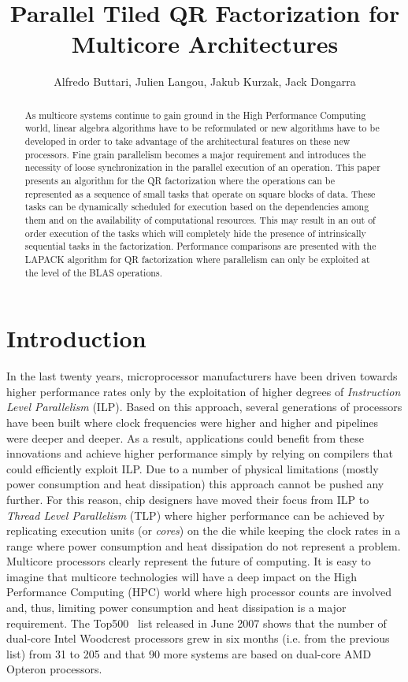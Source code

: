 \documentclass[runningheads]{llncs}
\title{Parallel Tiled QR Factorization for Multicore Architectures}
\author{Alfredo Buttari\inst{1},
  Julien Langou\inst{3},
  Jakub Kurzak\inst{1},
  Jack Dongarra\inst{1}\inst{2}
  }
\institute{Department of Electrical Engineering and Computer
Science, University Tennessee, Knoxville, Tennessee \and Computer
Science and Mathematics Division, Oak Ridge National Laboratory, Oak
Ridge, Tennessee \and Department of Mathematical Sciences,
University of Colorado at Denver and Health Sciences Center,
Colorado}
\begin{document}
\maketitle
\setcounter{page}{1}

\begin{abstract}
As multicore systems continue to gain ground in the High Performance
Computing world, linear algebra algorithms have to be reformulated
or new algorithms have to be developed in order to take advantage of
the architectural features on these new processors. Fine grain
parallelism becomes a major requirement and introduces the necessity
of loose synchronization in the parallel execution of an operation.
This paper presents an algorithm for the QR factorization where the
operations can be represented as a sequence of small tasks that
operate on square blocks of data. These tasks can be dynamically
scheduled for execution based on the dependencies among them and on
the availability of computational resources. This may result in an
out of order execution of the tasks which will completely hide the
presence of intrinsically sequential tasks in the factorization.
Performance comparisons are presented with the LAPACK algorithm for
QR factorization where parallelism can only be exploited at the
level of the BLAS operations.
\end{abstract}



\section{Introduction}

In the last twenty years, microprocessor manufacturers have been
driven towards higher performance rates only by the exploitation of
higher degrees of {\em Instruction Level Parallelism} (ILP). Based
on this approach, several generations of processors have been built
where clock frequencies were higher and higher and pipelines were
deeper and deeper. As a result, applications could benefit from
these innovations and achieve higher performance simply by relying
on compilers that could efficiently exploit ILP. Due to a number of
physical limitations (mostly power consumption and heat dissipation)
this approach cannot be pushed any further. For this reason, chip
designers have moved their focus from ILP to {\em Thread Level
  Parallelism} (TLP) where higher performance can be achieved by
replicating execution units (or {\em cores}) on the die while keeping
the clock rates in a range where power consumption and heat
dissipation do not represent a problem. Multicore processors clearly
represent the future of computing. It is easy to imagine that
multicore technologies will have a deep impact on the High Performance
Computing (HPC) world where high processor counts are involved
and, thus,  limiting power consumption and heat dissipation is a major
requirement. The Top500~\cite{top500} list released in June 2007 shows that
the number of dual-core Intel Woodcrest processors grew in six months
(i.e. from the previous list) from 31 to 205 and that 90 more systems
are based on dual-core AMD Opteron processors.
\end{document}
